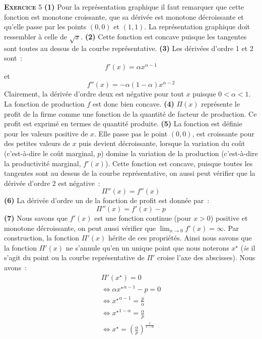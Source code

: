 \documentclass[10pt,a4paper,notitlepage]{article}
\newcommand{\exercice}[1]{\textsc{\textbf{Exercice}} #1}
\begin{document}
\bigskip

\exercice{5} \textbf{(1)} Pour la représentation graphique il faut
remarquer que cette fonction est monotone croissante, que sa dérivée
est monotone décroissante et qu'elle passe par les points $(0, 0)$ et
$(1, 1)$. La représentation graphique doit ressembler à celle de
$\sqrt{x}$. \textbf{(2)} Cette fonction est concave puisque les
tangentes sont toutes au dessus de la courbe
représentative. \textbf{(3)} Les dérivées d'ordre 1 et 2 sont :
\[
f'(x) = \alpha x^{\alpha-1}
\]
et
\[
f''(x) = -\alpha(1-\alpha) x^{\alpha-2}
\]
Clairement, la dérivée d'ordre deux est négative pour tout $x$ puisque
$0<\alpha<1$. La fonction de production $f$ est donc bien
concave. \textbf{(4)} $\Pi(x)$ représente le profit de la firme comme
une fonction de la quantité de facteur de production. Ce profit est
exprimé en termes de quantité produite. \textbf{(5)} La fonction est
définie pour les valeurs positive de $x$. Elle passe pas le point
$(0,0)$, est croissante pour des petites valeurs de $x$ puis devient
décroissante, lorsque la variation du coût (c'est-à-dire le coût
marginal, $p$) domine la variation de la production (c'est-à-dire la
productivité marginal, $f'(x)$). Cette fonction est concave, puisque
toutes les tangentes sont au dessus de la courbe représentative, on aussi
peut vérifier que la dérivée d'ordre 2 est négative :
\[
\Pi''(x) = f''(x)
\]
\textbf{(6)} La dérivée d'ordre un de la fonction de profit est donnée
par :
\[
\Pi''(x) = f'(x)-p
\]
\textbf{(7)} Nous savons que $f'(x)$ est une fonction continue (pour $x>0$) positive et monotone
décroissante, on peut aussi vérifier que $\lim_{x\rightarrow 0} f'(x)
= \infty$. Par construction, la fonction $\Pi'(x)$ hérite de ces
propriétés. Ainsi nous savons que la fonction $\Pi'(x)$ ne s'annule
qu'en un unique point que nous noterons $x^{\star}$ (\emph{ie} il
s'agit du point ou la courbe représentative de $\Pi'$ croise l'axe des
abscisses). Nous avons :
\[
  \begin{split}
    \Pi'(x^{\star}) = 0\\
    \Leftrightarrow \alpha \left. x^{\star} \right. ^{\alpha-1} - p = 0\\
    \Leftrightarrow \left. x^{\star} \right. ^{\alpha-1} = \frac{p}{\alpha} \\
    \Leftrightarrow \left. x^{\star} \right. ^{1-\alpha} = \frac{\alpha}{p} \\
    \Leftrightarrow x^{\star} = \left(\frac{\alpha}{p}\right)^{\frac{1}{1-\alpha}} \\
  \end{split}
\] 
\end{document}
